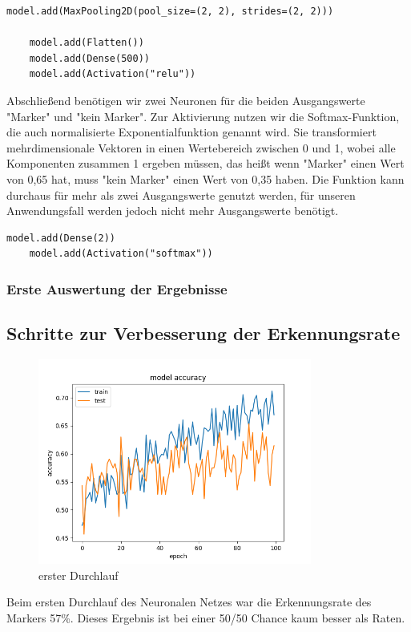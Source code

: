 \documentclass[conference]{IEEEtran}
\begin{document}
\begin{lstlisting}[label={list:model_1_3},caption=Modell: vierte und fünfte Schicht]
	model.add(MaxPooling2D(pool_size=(2, 2), strides=(2, 2)))

	model.add(Flatten())
	model.add(Dense(500))
	model.add(Activation("relu"))
\end{lstlisting}

Abschließend benötigen wir zwei Neuronen für die beiden Ausgangswerte "Marker" und "kein Marker".
Zur Aktivierung nutzen wir die Softmax-Funktion, die auch normalisierte Exponentialfunktion genannt wird.
Sie transformiert mehrdimensionale Vektoren in einen Wertebereich zwischen 0 und 1, wobei alle Komponenten zusammen 1 ergeben müssen, das heißt wenn "Marker" einen Wert von 0,65 hat, muss "kein Marker" einen Wert von 0,35 haben. 
Die Funktion kann durchaus für mehr als zwei Ausgangswerte genutzt werden, für unseren Anwendungsfall werden jedoch nicht mehr Ausgangswerte benötigt.

\begin{lstlisting}[label={list:model_1_4},caption=Modell: finale sechste Schicht]
	model.add(Dense(2))
	model.add(Activation("softmax"))
\end{lstlisting}

\subsubsection{Erste Auswertung der Ergebnisse}	%

\subsection{Schritte zur Verbesserung der Erkennungsrate} %


\begin{figure}[!h]
	\centering
	\includegraphics[width=9cm]{img/160x120:100@32_accuracy.png}
	\caption{erster Durchlauf}
	\label{Initiales Ergebnis}
\end{figure}
Beim ersten Durchlauf des Neuronalen Netzes war die Erkennungsrate des Markers 57\%. Dieses Ergebnis ist bei einer 50/50 Chance kaum besser als Raten.\\
\end{document}
